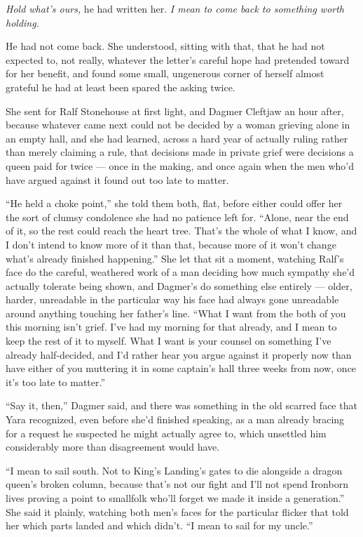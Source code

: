 \textit{Hold what’s ours,} he had written her. \textit{I mean to come back to something worth holding.}

He had not come back. She understood, sitting with that, that he had not expected to, not really, whatever the letter’s careful hope had pretended toward for her benefit, and found some small, ungenerous corner of herself almost grateful he had at least been spared the asking twice.

\sceneBreak

She sent for Ralf Stonehouse at first light, and Dagmer Cleftjaw an hour after, because whatever came next could not be decided by a woman grieving alone in an empty hall, and she had learned, across a hard year of actually ruling rather than merely claiming a rule, that decisions made in private grief were decisions a queen paid for twice — once in the making, and once again when the men who’d have argued against it found out too late to matter.

“He held a choke point,” she told them both, flat, before either could offer her the sort of clumsy condolence she had no patience left for. “Alone, near the end of it, so the rest could reach the heart tree. That’s the whole of what I know, and I don’t intend to know more of it than that, because more of it won’t change what’s already finished happening.” She let that sit a moment, watching Ralf’s face do the careful, weathered work of a man deciding how much sympathy she’d actually tolerate being shown, and Dagmer’s do something else entirely — older, harder, unreadable in the particular way his face had always gone unreadable around anything touching her father’s line. “What I want from the both of you this morning isn’t grief. I’ve had my morning for that already, and I mean to keep the rest of it to myself. What I want is your counsel on something I’ve already half-decided, and I’d rather hear you argue against it properly now than have either of you muttering it in some captain’s hall three weeks from now, once it’s too late to matter.”

“Say it, then,” Dagmer said, and there was something in the old scarred face that Yara recognized, even before she’d finished speaking, as a man already bracing for a request he suspected he might actually agree to, which unsettled him considerably more than disagreement would have.

“I mean to sail south. Not to King’s Landing’s gates to die alongside a dragon queen’s broken column, because that’s not our fight and I’ll not spend Ironborn lives proving a point to smallfolk who’ll forget we made it inside a generation.” She said it plainly, watching both men’s faces for the particular flicker that told her which parts landed and which didn’t. “I mean to sail for my uncle.”

